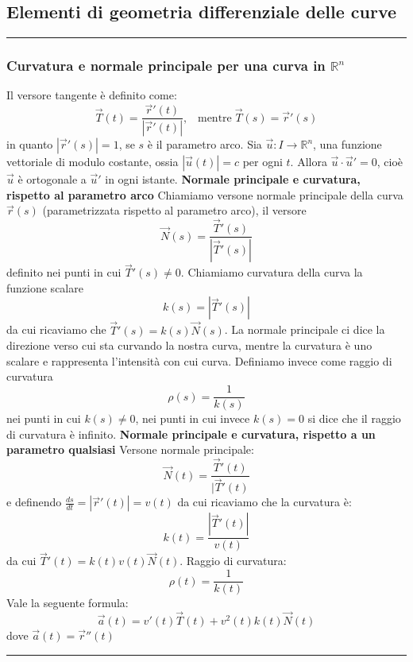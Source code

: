 \subsection{Elementi di geometria differenziale delle curve}
\rule{\textwidth}{0,4pt}
\subsubsection{Curvatura e normale principale per una curva in $\mathbb{R}^n$}
Il versore tangente è definito come:
\[
    \vec{T}(t) = \frac{\vec{r}'(t)}{|\vec{r}'(t)|}\text{,} \quad \text{mentre} \;\vec{T}(s) =\vec{r}'(s)
\]
in quanto $|\vec{r}'(s)| = 1$, se $s$ è il parametro arco.\newline
Sia $\vec{u}: I \rightarrow \mathbb{R}^n$, una funzione vettoriale di modulo costante, ossia $|\vec{u}(t)| = c$ per ogni $t$. Allora $\vec{u} \cdot \vec{u}' = 0$, cioè $\vec{u}$ è ortogonale a $\vec{u}'$ in ogni istante.\newline
\newline
\textbf{Normale principale e curvatura, rispetto al parametro arco}\newline
Chiamiamo versone normale principale della curva $\vec{r}(s)$ (parametrizzata rispetto al parametro arco), il versore
\[
    \vec{N}(s) =\frac{\vec{T}'(s)}{|\vec{T}'(s)|}
\]
definito nei punti in cui $\vec{T}'(s) \neq 0$.\newline
Chiamiamo curvatura della curva la funzione scalare
\[
    k(s) = |\vec{T}'(s)|
\]
da cui ricaviamo che $\vec{T}'(s) = k(s) \vec{N}(s)$. \newline
La normale principale ci dice la direzione verso cui sta curvando la nostra curva, mentre la curvatura è uno scalare e rappresenta l'intensità con cui curva.\newline
Definiamo invece come raggio di curvatura
\[
    \rho(s) = \frac{1}{k(s)}
\]
nei punti in cui $k(s) \neq 0$, nei punti in cui invece $k(s) = 0$ si dice che il raggio di curvatura è infinito.\newline
\newline
\newline
\textbf{Normale principale e curvatura, rispetto a un parametro qualsiasi}\newline
Versone normale principale:
\[
    \vec{N}(t) =\frac{\vec{T}'(t)}{|\vec{T}'(t)}
\]
e definendo $\frac{ds}{dt} = |\vec{r}'(t)| = v(t)$ da cui ricaviamo che la curvatura è:
\[
    k(t) = \frac{|\vec{T}'(t)|}{v(t)}
\]
da cui $\vec{T}'(t) = k(t)v(t)\vec{N}(t)$.\newline
Raggio di curvatura:
\[
    \rho(t)= \frac{1}{k(t)}
\]
\newline
Vale la seguente formula:
\[
    \vec{a}(t) = v'(t)\vec{T}(t) + v^2(t) k(t) \vec{N}(t)
\]
dove $\vec{a}(t) = \vec{r}''(t)$\newline
\newline
\rule{\textwidth}{0,4pt}
